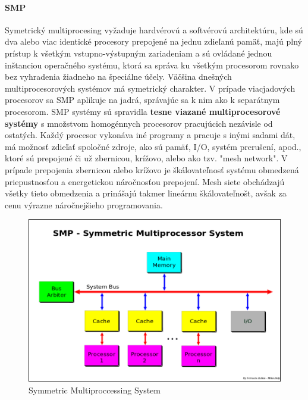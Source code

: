 \documentclass[11pt,a4paper]{report}
\begin{document}
\paragraph{SMP} Symetrický multiprocesing vyžaduje hardvérovú a softvérovú architektúru, kde sú dva alebo viac identické procesory prepojené na jednu zdieľanú pamäť, majú plný prístup k všetkým vstupno-výstupným zariadeniam a sú ovládané jednou inštanciou operačného systému, ktorá sa správa ku všetkým procesorom rovnako bez vyhradenia žiadneho na špeciálne účely. Väčšina dnešných multiprocesorových systémov má symetrický charakter. V prípade viacjadových procesorov sa SMP aplikuje na jadrá, správajúc sa k nim ako k separátnym procesorom. SMP systémy sú spravidla \textbf{tesne viazané multiprocesorové systémy} s množstvom homogénnych procesorov pracujúcich nezávisle od ostatých. Každý procesor vykonáva iné programy a pracuje s inými sadami dát, má možnosť zdieľať spoločné zdroje, ako sú pamäť, I/O, systém prerušení, apod., ktoré sú prepojené či už zbernicou, krížovo, alebo ako tzv. "mesh network". V prípade prepojenia zbernicou alebo krížovo je škálovateľnosť systému obmedzená priepustnosťou a energetickou náročnosťou prepojení. Mesh siete obchádzajú všetky tieto obmedzenia a prinášajú takmer lineárnu škálovateľnošt, avšak za cenu výrazne náročnejšieho programovania.

\begin{figure}[ht]
        \centering
        \includegraphics[scale=0.4]{images/SMP}
        \caption{Symmetric Multiproccessing System}
        \label{SMP:}
\end{figure}
\newpage
\end{document}
